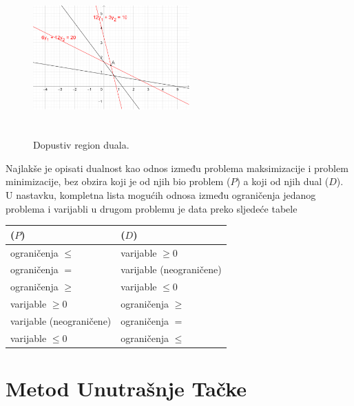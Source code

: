 \documentclass[a4paper, utf8, 11pt, colorlinks]{book}
\begin{document}
\begin{figure}[!ht]
    \centering
    \includegraphics[width=170pt, height=170pt]{fig6.eps}
    \caption{Dopustiv region duala.}
    \label{fig:fig6-dual-region}
\end{figure}

Najlakše je opisati dualnost kao odnos između problema maksimizacije i problem minimizacije, bez obzira 
koji je od njih bio problem ($P$) a koji od njih  dual ($D$). 
U nastavku, kompletna lista mogućih odnosa između ograničenja
jedanog problema i varijabli u drugom problemu je data preko sljedeće tabele
\begin{table}[!ht]
	\centering
    \begin{tabular}{l|l}
      ($P$) & ($D$) \\ \hline
      ograničenja $\leq$  & varijable $\geq 0$ \\
      ograničenja $=$     & varijable (neograničene) \\
      ograničenja $\geq$  & varijable $\leq 0$ \\
      varijable $\geq 0$    & ograničenja $\geq$ \\
      varijable (neograničene) & ograničenja $=$ \\
      varijable $\leq 0$         & ograničenja $\leq$ \\ \hline
    \end{tabular}
\end{table}


\section{Metod Unutrašnje Tačke}
\end{document}
